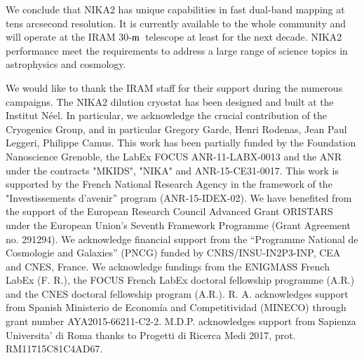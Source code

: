 \documentclass[traditionalabstract]{aa}
\newcommand{\trentemetre}{30-$\rm{m}$}
\newcommand{\lp}[1]{#1}
\begin{document}
We conclude that NIKA2 has unique capabilities in fast dual-band
mapping at tens arcsecond resolution. {\lp It is currently available to the
whole community and will operate at the IRAM \trentemetre\ telescope
at least for the next decade.}
NIKA2 performance meet the requirements
to address a large range of science topics in astrophysics and
cosmology. 




%


\begin{acknowledgements}
  We would like to thank the IRAM staff for their support during the
  numerous campaigns. 
  The NIKA2 dilution cryostat has been designed and built at the Institut N\'eel. 
  In particular, we acknowledge the crucial contribution of the Cryogenics Group, and 
  in particular Gregory Garde, Henri Rodenas, Jean Paul Leggeri, Philippe Camus. 
  This work has been partially funded by the Foundation Nanoscience
  Grenoble, the LabEx FOCUS ANR-11-LABX-0013 and the ANR under the
  contracts "MKIDS", "NIKA" and ANR-15-CE31-0017. This work is
  supported by the French National Research Agency in the framework of
  the "Investissements d’avenir” program (ANR-15-IDEX-02).
  We have benefited from the support of the European Research Council Advanced
  Grant ORISTARS under the European Union's Seventh Framework
  Programme (Grant Agreement no. 291294). We acknowledge financial
  support from the “Programme National de Cosmologie and Galaxies”
  (PNCG) funded by CNRS/INSU-IN2P3-INP, CEA and CNES, France.
  We acknowledge fundings from the ENIGMASS French LabEx (F. R.), the FOCUS French
  LabEx doctoral fellowship programme (A.R.) and the CNES doctoral
  fellowship program (A.R.). R. A. acknowledges support from
  Spanish Ministerio de Econom\'ia and Competitividad (MINECO) through
  grant number AYA2015-66211-C2-2. M.D.P. acknowledges support from
  Sapienza Universita' di Roma thanks to Progetti di Ricerca Medi 2017,
  prot. RM11715C81C4AD67. 
\end{acknowledgements}
\end{document}
